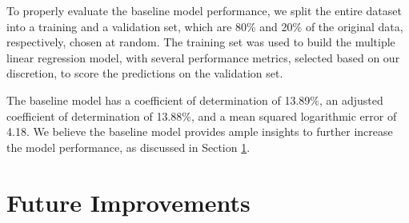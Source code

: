 \documentclass[11pt, letterpaper]{article}
\begin{document}
To properly evaluate the baseline model performance, we split the entire dataset into a training and a validation set, which are 80\% and 20\% of the original data, respectively, chosen at random. The training set was used to build the multiple linear regression model, with several performance metrics, selected based on our discretion, to score the predictions on the validation set.

The baseline model has a coefficient of determination of 13.89\%, an adjusted coefficient of determination of 13.88\%, and a mean squared logarithmic error of 4.18. We believe the baseline model provides ample insights to further increase the model performance, as discussed in Section \ref{sec:improvements}.

\section{Future Improvements}\label{sec:improvements}
\end{document}
